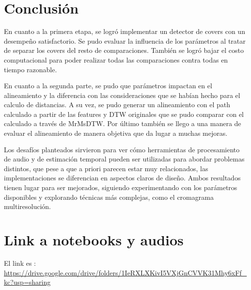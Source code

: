 \documentclass{article}
\begin{document}
\section{Conclusión}
En cuanto a la primera etapa, se logró implementar un detector de covers con un desempeño satisfactorio. Se pudo evaluar la influencia de los parámetros al tratar de separar los covers del resto de comparaciones. También se logró bajar el costo computacional para poder realizar todas las comparaciones contra todas en tiempo razonable. 

En cuanto a la segunda parte, se pudo que parámetros impactan en el alineamiento y la diferencia con las consideraciones que se habían hecho para el calculo de distancias. A su vez, se pudo generar un alineamiento con el path calculado a partir de las features y DTW originales que se pudo comparar con el calculado a través de MrMsDTW. Por último también se llego a una manera de evaluar el alineamiento de manera objetiva que da lugar a muchas mejoras.   

Los desafíos planteados sirvieron para ver cómo herramientas de procesamiento de audio y de estimación temporal pueden ser utilizadas para abordar problemas distintos, que pese a que a priori parecen estar muy relacionados, las implementaciones se diferencian en aspectos claros de diseño. Ambos resultados tienen lugar para ser mejorados, siguiendo experimentando con los parámetros disponibles y explorando técnicas más complejas, como el cromagrama multiresolución.

\newpage
\section{Link a notebooks y audios}
El link es : \url{https://drive.google.com/drive/folders/1IeRXLXKivI5VXjGnCVVK31Mhy6xFf_kc?usp=sharing}



\end{document}
